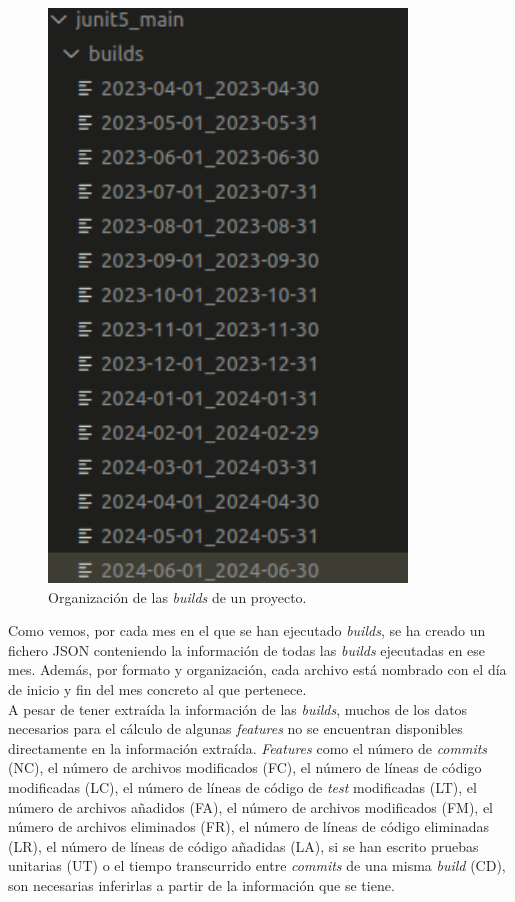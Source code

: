 \begin{figure}[H]
    \centering
    \includegraphics[scale=0.8]{images/Builds junit5.pdf}
    \caption{Organización de las \textit{builds} de un proyecto.}
    \label{fig:builds_junit5}
\end{figure}

Como vemos, por cada mes en el que se han ejecutado \textit{builds}, se ha creado un fichero
JSON conteniendo la información de todas las \textit{builds} ejecutadas en ese mes. Además, por
formato y organización, cada archivo está nombrado con el día de inicio y fin del mes concreto
al que pertenece.\\

A pesar de tener extraída la información de las \textit{builds}, muchos de los datos necesarios
para el cálculo de algunas \textit{features} no se encuentran disponibles directamente en la
información extraída. \textit{Features} como el  número de \textit{commits} (NC), el número de
archivos modificados (FC), el número de líneas de código modificadas (LC), el número de líneas de
código de \textit{test} modificadas (LT), el número de archivos añadidos (FA), el número de
archivos modificados (FM), el número de archivos eliminados (FR), el número de líneas de código
eliminadas (LR), el número de líneas de código añadidas (LA), si se han escrito pruebas unitarias
(UT) o el tiempo transcurrido entre \textit{commits} de una misma \textit{build} (CD), son
necesarias inferirlas a partir de la información que se tiene.\\
